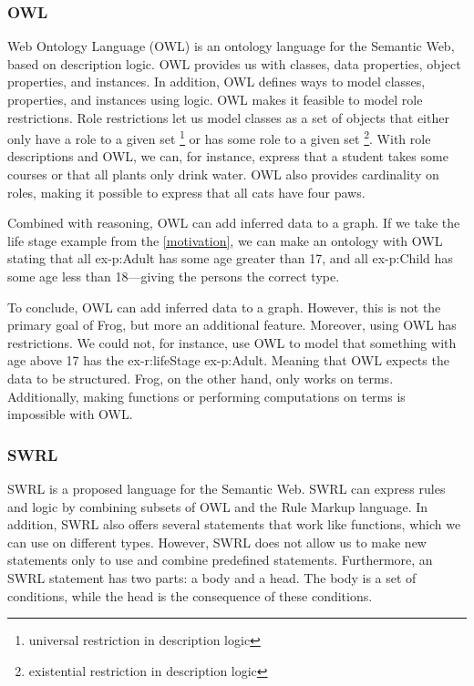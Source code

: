 \subsubsection{OWL}
Web Ontology Language (OWL) \autocite{OWL} is an ontology language for the Semantic Web, based on description logic. OWL provides us with classes, data properties, object properties, and instances. In addition, OWL defines ways to model classes, properties, and instances using logic. OWL makes it feasible to model role restrictions. Role restrictions let us model classes as a set of objects that either only have a role to a given set \footnote{universal restriction in description logic} or has some role to a given set \footnote{existential restriction in description logic}.  With role descriptions and OWL, we can, for instance, express that a student takes some courses or that all plants only drink water. OWL also provides cardinality on roles, making it possible to express that all cats have four paws.

\para
Combined with reasoning, OWL can add inferred data to a graph. If we take the life stage example from the \autoref{motivation}, we can make an ontology with OWL stating that all ex-p:Adult has some age greater than 17, and all ex-p:Child has some age less than 18—giving the persons the correct type.

\para 
To conclude, OWL can add inferred data to a graph. However, this is not the primary goal of Frog, but more an additional feature. Moreover, using OWL has restrictions. We could not, for instance, use OWL to model that something with age above 17 has the ex-r:lifeStage ex-p:Adult. Meaning that OWL expects the data to be structured. Frog, on the other hand, only works on terms. Additionally, making functions or performing computations on terms is impossible with OWL.

\subsubsection{SWRL}
SWRL \autocite{SWRL} is a proposed language for the Semantic Web. SWRL can express rules and logic by combining subsets of OWL and the Rule Markup language. In addition, SWRL also offers several statements that work like functions, which we can use on different types. However, SWRL does not allow us to make new statements only to use and combine predefined statements. Furthermore, an SWRL statement has two parts: a body and a head. The body is a set of conditions, while the head is the consequence of these conditions.

